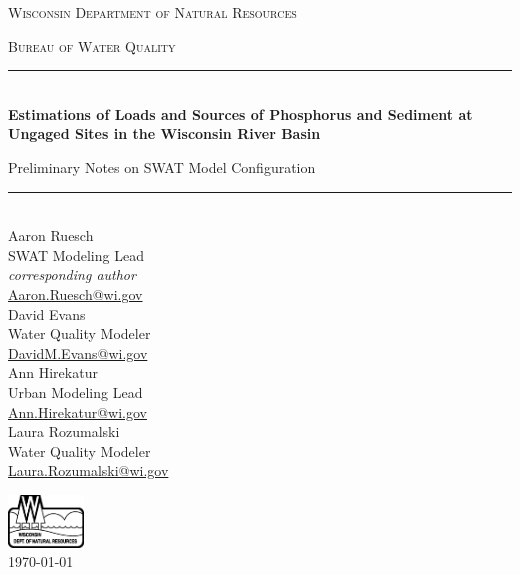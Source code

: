 \begin{titlepage}
\begin{center}
	\bigskip
	\textsc{ \Large  Wisconsin Department of Natural Resources}\par
	\medskip
	\textsc{ \Large Bureau of Water Quality}\par
	\bigskip
	\rule{\linewidth}{0.5mm} \\[0.4cm]
	\textbf{\Large Estimations of Loads and Sources of Phosphorus and Sediment at Ungaged Sites in the Wisconsin River Basin}\par
	\medskip
	{\Large Preliminary Notes on SWAT Model Configuration}\par
	\rule{\linewidth}{0.5mm} \\[0.4cm]
	\bigskip
	\noindent
	Aaron Ruesch \\
	SWAT Modeling Lead \\
	\textit{corresponding author} \\
	\href{mailto:Aaron.Ruesch@wi.gov}{Aaron.Ruesch@wi.gov} \\
	\medskip
	David Evans \\
	Water Quality Modeler \\
	\href{mailto:DavidM.Evans@wi.gov}{DavidM.Evans@wi.gov} \\
	\medskip
	Ann Hirekatur \\
	Urban Modeling Lead \\
	\href{mailto:Ann.Hirekatur@wi.gov}{Ann.Hirekatur@wi.gov} \\
	\medskip
	Laura Rozumalski \\
	Water Quality Modeler \\
	\href{mailto:Laura.Rozumalski@wi.gov}{Laura.Rozumalski@wi.gov} \\

	\vfill
	
	\includegraphics[width=0.15\textwidth]{./img/DNR2.eps} \\
	\medskip
	{\large \today}
	
\end{center}
\end{titlepage}
